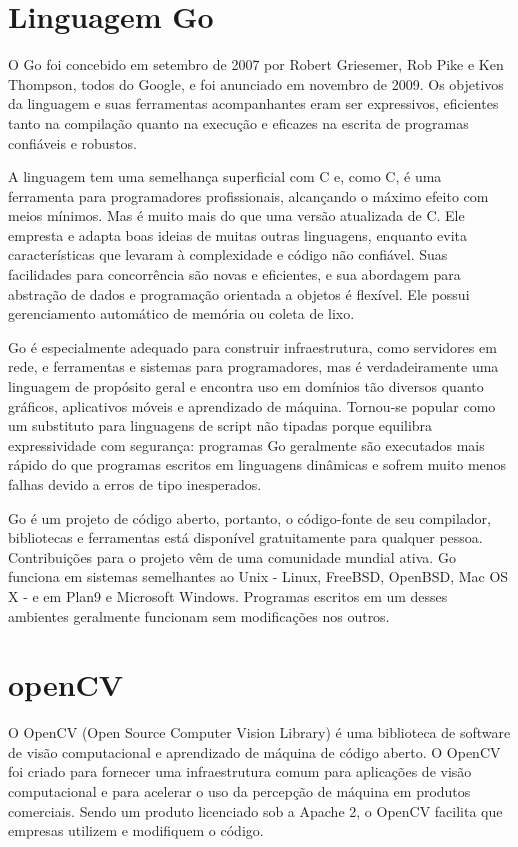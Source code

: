 \documentclass[12pt, %
openright, 
oneside, %
a4paper,    %
brazil]{facom-ufu-abntex2}
\begin{document}
\section{Linguagem Go}

O Go foi concebido em setembro de 2007 por Robert Griesemer, Rob Pike e Ken
Thompson, todos do Google, e foi anunciado em novembro de 2009. Os objetivos da
linguagem e suas ferramentas acompanhantes eram ser expressivos, eficientes
tanto na compilação quanto na execução e eficazes na escrita de programas
confiáveis e robustos.

A linguagem tem uma semelhança superficial com C e, como C, é uma ferramenta
para programadores profissionais, alcançando o máximo efeito com meios mínimos.
Mas é muito mais do que uma versão atualizada de C. Ele empresta e adapta boas
ideias de muitas outras linguagens, enquanto evita características que levaram
à complexidade e código não confiável. Suas facilidades para concorrência são
novas e eficientes, e sua abordagem para abstração de dados e programação
orientada a objetos é flexível. Ele possui gerenciamento automático de memória
ou coleta de lixo.

Go é especialmente adequado para construir infraestrutura, como servidores em
rede, e ferramentas e sistemas para programadores, mas é verdadeiramente uma
linguagem de propósito geral e encontra uso em domínios tão diversos quanto
gráficos, aplicativos móveis e aprendizado de máquina. Tornou-se popular como
um substituto para linguagens de script não tipadas porque equilibra
expressividade com segurança: programas Go geralmente são executados mais
rápido do que programas escritos em linguagens dinâmicas e sofrem muito menos
falhas devido a erros de tipo inesperados.

Go é um projeto de código aberto, portanto, o código-fonte de seu compilador,
bibliotecas e ferramentas está disponível gratuitamente para qualquer pessoa.
Contribuições para o projeto vêm de uma comunidade mundial ativa. Go funciona
em sistemas semelhantes ao Unix - Linux, FreeBSD, OpenBSD, Mac OS X - e em
Plan9 e Microsoft Windows. Programas escritos em um desses ambientes geralmente
funcionam sem modificações nos outros. \cite{donovan2015go}

\section{openCV}

O OpenCV (Open Source Computer Vision Library) é uma biblioteca de software de
visão computacional e aprendizado de máquina de código aberto. O OpenCV foi
criado para fornecer uma infraestrutura comum para aplicações de visão
computacional e para acelerar o uso da percepção de máquina em produtos
comerciais. Sendo um produto licenciado sob a Apache 2, o OpenCV facilita que
empresas utilizem e modifiquem o código.
\end{document}
